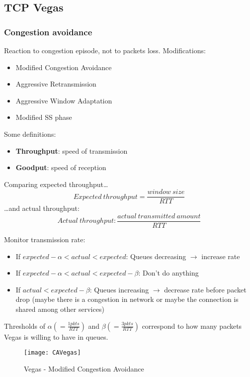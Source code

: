\subsection{TCP Vegas}

\subsubsection{Congestion avoidance}

Reaction to congestion episode, not to packets loss.
Modifications:
\begin{itemize}
  \item Modified Congestion Avoidance
  \item Aggressive Retransmission
  \item Aggressive Window Adaptation
  \item Modified SS phase
\end{itemize}

Some definitions:
\begin{itemize}
  \item \textbf{Throughput}: speed of transmission
  \item \textbf{Goodput}: speed of reception
\end{itemize}

\noindent Comparing expected throughput\dots
\begin{equation*}
Expected\ throughput = \frac{window\ size}{RTT}
\end{equation*}
\dots and actual throughput:
\begin{equation*}
Actual\ throughput: \frac{actual\ transmitted\ amount}{RTT}
\end{equation*}

\noindent Monitor transmission rate:
\begin{itemize}
\item If $expected - \alpha < actual < expected$: Queues decreasing
  $\rightarrow$ increase rate
\item If $expected - \alpha < actual < expected - \beta$: Don’t do anything
\item If $actual < expected - \beta$: Queues increasing $\rightarrow$ decrease
  rate before packet drop (maybe there is a congestion in network or maybe the
  connection is shared among other services) 
\end{itemize}

Thresholds of $\alpha (= \frac{1 pkts}{RTT})$ and
$\beta (= \frac{3 pkts}{RTT})$ correspond to how many packets Vegas is willing
to have in queues.
\begin{figure}[t]
  \centering
  \texttt{[image: CAVegas]}
  \caption{Vegas - Modified Congestion Avoidance}
  \label{fig:tcpVegas:mca}
\end{figure}




